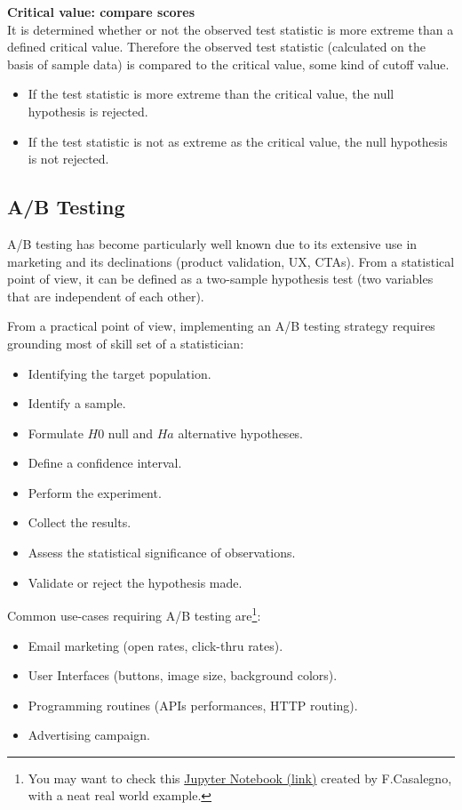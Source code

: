 \documentclass{article}
\begin{document}
\textbf{Critical value: compare scores}\\
It is determined whether or not the observed test statistic is more extreme than a defined critical value. Therefore the observed test statistic (calculated on the basis of sample data) is compared to the critical value, some kind of cutoff value.
\begin{itemize}
    \item If the test statistic is more extreme than the critical value, the null hypothesis is rejected. 
    \item If the test statistic is not as extreme as the critical value, the null hypothesis is not rejected.
\end{itemize}

\subsection{A/B Testing}
A/B testing has become particularly well known due to its extensive use in marketing and its declinations (product validation, UX, CTAs).
From a statistical point of view, it can be defined as a two-sample hypothesis test (two variables that are independent of each other). 

From a practical point of view, implementing an A/B testing strategy requires grounding most of skill set of a statistician:
\begin{itemize}
    \item Identifying the target population.
    \item Identify a sample.
    \item Formulate $H0$ null and $Ha$ alternative hypotheses.
    \item Define a confidence interval. 
    \item Perform the experiment.
    \item Collect the results.
    \item Assess the statistical significance of observations.
    \item Validate or reject the hypothesis made.
\end{itemize}

Common use-cases requiring A/B testing are\footnote{You may want to check this \href{https://github.com/FrancescoCasalegno/AB-Testing/blob/main/AB_Testing.ipynb}{Jupyter Notebook (link)} created by F.Casalegno, with a neat real world example.}:
\begin{itemize}
    \item Email marketing (open rates, click-thru rates).
    \item User Interfaces (buttons, image size, background colors).
    \item Programming routines (APIs performances, HTTP routing).
    \item Advertising campaign.
\end{itemize}
\end{document}
